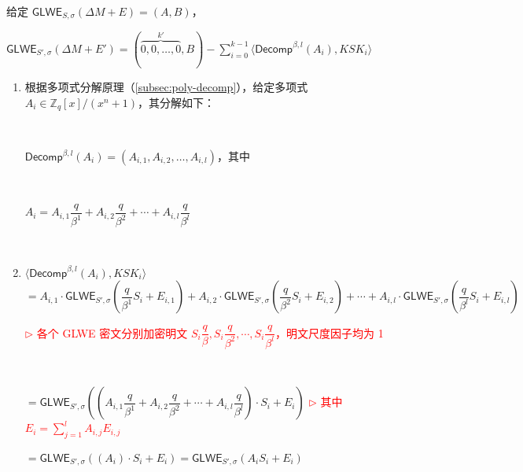 \begin{tcolorbox}[title={\textbf{\tboxlabel{\ref*{sec:glwe-key-switching}} GLWE 密钥切换}}]

给定 $\textsf{GLWE}_{S,\sigma}(\Delta M + E) = (A, B)$，

$\textsf{GLWE}_{S',\sigma}(\Delta M + E') = (\overbrace{0, 0, \ldots, 0}^{k'}, B) - \sum \limits_{i=0}^{k-1} \langle \textsf{Decomp}^{\beta, l}(A_i), \mathit{KSK}_i \rangle$
\end{tcolorbox}



\begin{myproof}

\begin{enumerate}
\item 根据多项式分解原理（\autoref{subsec:poly-decomp}），给定多项式 $A_i \in \mathbb{Z}_q[x] / (x^n + 1)$，其分解如下：

$ $

$\textsf{Decomp}^{\beta, l}(A_i) = (A_{ i,1 }, A_{ i,2 }, \ldots, A_{ i,l })$，其中

$ $

$A_i = A_{ i, 1 } \dfrac{q}{\beta^1} + A _{ i, 2 }\dfrac{q}{\beta^2} + \cdots + A_{ i, l } \dfrac{q}{\beta^l}  $

$ $

\item $\langle \textsf{Decomp}^{\beta, l}(A_i), \mathit{KSK}_i \rangle $ \\
$ =  A_{ i,1 } \cdot \textsf{GLWE}_{S', \sigma} \left ( 
 \dfrac{q}{\beta^1}S_i + E_{i, 1} \right ) + A_{ i,2 } \cdot \textsf{GLWE}_{S', \sigma} \left ( 
 \dfrac{q}{\beta^2}S_i  + E_{i, 2} \right ) + \cdots + A_{ i,l } \cdot \textsf{GLWE}_{S', \sigma} \left ( 
 \dfrac{q}{\beta^l}S_i  + E_{i, l} \right ) $ 

\textcolor{red}{ $\rhd$ 各个 \textsf{GLWE} 密文分别加密明文 $S_i\dfrac{q}{\beta}, S_i\dfrac{q}{\beta^2}, \cdots, S_i\dfrac{q}{\beta^l}$，明文尺度因子均为 1}

$ $
 
$= \textsf{GLWE}_{S', \sigma} \left ( 
 \left ( A_{ i,1 } \dfrac{q}{\beta^1} + A_{ i,2 } \dfrac{q}{\beta^2} + \cdots + A_{ i,l } \dfrac{q}{\beta^l} \right ) \cdot S_i + E_i \right )$ \textcolor{red}{ $\rhd$ 其中 $E_i = \sum\limits_{j=1}^{l} A_{ i, j } E_{i, j}$}

 
$= \textsf{GLWE}_{S', \sigma} \left ( 
 \left ( A_i \right ) \cdot S_i + E_i \right ) = \textsf{GLWE}_{S', \sigma} ( 
 A_i  S_i  + E_i) $ 

$ $
 

\end{enumerate}
\end{myproof}

